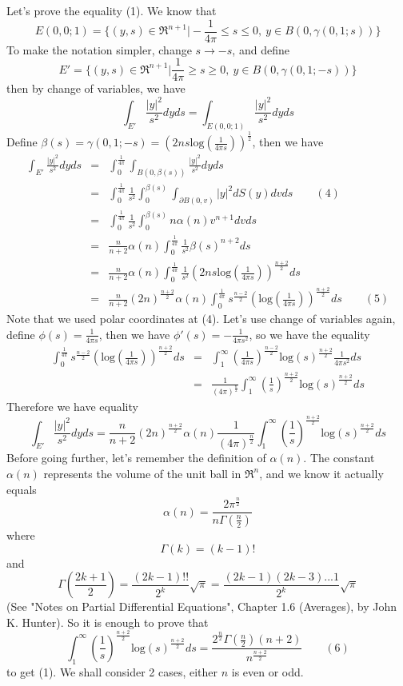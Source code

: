 \documentclass[a4paper,10pt]{article}
\begin{document}
Let's prove the equality (1). We know that $$E(0,0;1)=\{(y,s)\in\Re^{n+1}\big|-\frac{1}{4\pi}\le s\le 0, \> y\in B(0,\gamma(0,1;s))\}$$ To make the notation simpler, change $s\rightarrow -s$, and define $$E'=\{(y,s)\in\Re^{n+1}\big|\frac{1}{4\pi}\ge s\ge 0, \> y\in B(0,\gamma(0,1;-s))\}$$ then by change of variables, we have $$\int_{E'}\frac{|y|^2}{s^2}dyds=\int_{E(0,0;1)}\frac{|y|^2}{s^2}dyds$$ Define $\beta(s)=\gamma(0,1;-s)=(2ns\text{log}(\frac{1}{4\pi s}))^{\frac{1}{2}}$, then we have \begin{eqnarray*}
\int_{E'}\frac{|y|^2}{s^2}dyds&=&\int_{0}^{\frac{1}{4\pi}}\int_{B(0,\beta(s))}\frac{|y|^2}{s^2}dyds\\
&=&\int_{0}^{\frac{1}{4\pi}}\frac{1}{s^2}\int_{0}^{\beta(s)}\int_{\partial B(0,v)}|y|^2dS(y)dvds\qquad(4)\\
&=&\int_{0}^{\frac{1}{4\pi}}\frac{1}{s^2}\int_{0}^{\beta(s)}n\alpha(n)v^{n+1}dvds\\
&=& \frac{n}{n+2}\alpha(n)\int_{0}^{\frac{1}{4\pi}}\frac{1}{s^2}\beta(s)^{n+2}ds \\
&=&\frac{n}{n+2}\alpha(n)\int_{0}^{\frac{1}{4\pi}}\frac{1}{s^2}(2ns\text{log}(\frac{1}{4\pi s}))^{\frac{n+2}{2}}ds\\
&=&\frac{n}{n+2}(2n)^{\frac{n+2}{2}}\alpha(n)\int_{0}^{\frac{1}{4\pi}}s^{\frac{n-2}{2}}(\text{log}(\frac{1}{4\pi s}))^{\frac{n+2}{2}}ds \qquad(5)
\end{eqnarray*} 
Note that we used polar coordinates at (4). Let's use change of variables again, define $\phi(s)=\frac{1}{4\pi s}$, then we have $\phi'(s)=-\frac{1}{4\pi s^2}$, so we have the equality \begin{eqnarray*}
\int_{0}^{\frac{1}{4\pi}}s^{\frac{n-2}{2}}(\text{log}(\frac{1}{4\pi s}))^{\frac{n+2}{2}}ds&=&\int_{1}^{\infty}(\frac{1}{4\pi s})^{\frac{n-2}{2}}\text{log}(s)^{\frac{n+2}{2}}\frac{1}{4\pi s^2}ds\\
&=&\frac{1}{(4\pi)^{\frac{n}{2}}}\int_{1}^{\infty}(\frac{1}{s})^{\frac{n+2}{2}}\text{log}(s)^{\frac{n+2}{2}}ds
\end{eqnarray*} 
Therefore we have equality $$\int_{E'}\frac{|y|^2}{s^2}dyds=\frac{n}{n+2}(2n)^{\frac{n+2}{2}}\alpha(n)\frac{1}{(4\pi)^{\frac{n}{2}}}\int_{1}^{\infty}(\frac{1}{s})^{\frac{n+2}{2}}\text{log}(s)^{\frac{n+2}{2}}ds$$ Before going further, let's remember the definition of $\alpha(n)$. The constant $\alpha(n)$ represents the volume of the unit ball in $\Re^n$, and we know it actually equals $$\alpha(n)=\frac{2\pi^{\frac{n}{2}}}{n\Gamma(\frac{n}{2})}$$ where $$\Gamma(k)=(k-1)!$$ and $$\Gamma(\frac{2k+1}{2})=\frac{(2k-1)!!}{2^k}\sqrt{\pi}=\frac{(2k-1)(2k-3)...1}{2^k}\sqrt{\pi}$$(See "Notes on Partial Differential Equations",  Chapter 1.6 (Averages), by John K. Hunter). So it is enough to prove that $$\int_{1}^{\infty}(\frac{1}{s})^{\frac{n+2}{2}}\text{log}(s)^{\frac{n+2}{2}}ds=\frac{2^{\frac{n}{2}}\Gamma(\frac{n}{2})(n+2)}{n^{\frac{n+2}{2}}}\qquad(6)$$ to get (1). We shall consider 2 cases, either $n$ is even or odd.\\ 
\end{document}
